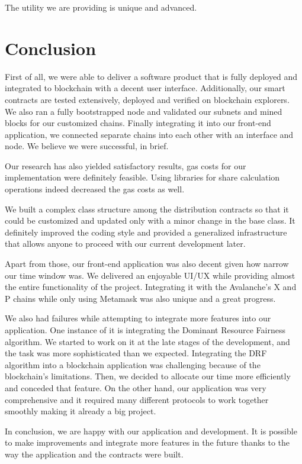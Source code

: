 \documentclass[a4paper,12pt]{report}
\begin{document}
The utility we are providing is unique and advanced. 

\chapter{Conclusion}
First of all, we were able to deliver a software product that is fully deployed and integrated to blockchain with a decent user interface. Additionally, our smart contracts are tested extensively, deployed and verified on blockchain explorers. We also ran a fully bootstrapped node and validated our subnets and mined blocks for our customized chains. Finally integrating it into our front-end application, we connected separate chains into each other with an interface and node. We believe we were successful, in brief.

Our research has also yielded satisfactory results, gas costs for our implementation were definitely feasible. Using libraries for share calculation operations indeed decreased the gas costs as well.

We built a complex class structure among the distribution contracts so that it could be customized and updated only with a minor change in the base class. It definitely improved the coding style and provided a generalized infrastructure that allows anyone to proceed with our current development later.

Apart from those, our front-end application was also decent given how narrow our time window was. We delivered an enjoyable UI/UX while providing almost the entire functionality of the project. Integrating it with the Avalanche’s X and P chains while only using Metamask was also unique and a great progress.

\newpage 
We also had failures while attempting to integrate more features into our application. One instance of it is integrating the Dominant Resource Fairness algorithm. We started to work on it at the late stages of the development, and the task was more sophisticated than we expected. Integrating the DRF algorithm into a blockchain application was challenging because of the blockchain’s limitations. Then, we decided to allocate our time more efficiently and conceded that feature. On the other hand, our application was very comprehensive and it required many different protocols to work together smoothly making it already a big project.

In conclusion, we are happy with our application and development. It is possible to make improvements and integrate more features in the future thanks to the way the application and the contracts were built.
\end{document}
